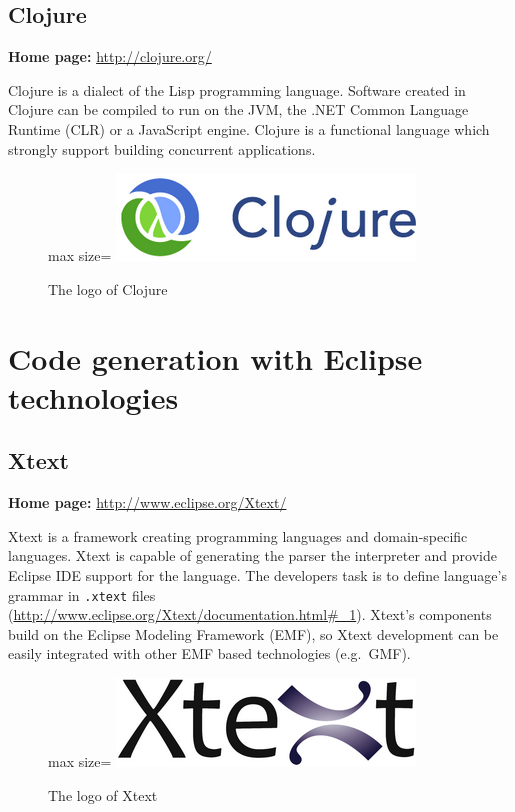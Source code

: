 \documentclass[]{report}
\let\Oldincludegraphics\includegraphics
\renewcommand{\includegraphics}[1]{
\begin{adjustbox}{max size={\textwidth}{\textheight}}
    \Oldincludegraphics[scale=0.6]{#1}%
\end{adjustbox}
}
\begin{document}
\subsection{Clojure}

\textbf{Home page:} \url{http://clojure.org/}

Clojure is a dialect of the Lisp programming language. Software created
in Clojure can be compiled to run on the JVM, the .NET Common Language
Runtime (CLR) or a JavaScript engine. Clojure is a functional language
which strongly support building concurrent applications.

\begin{figure}[htbp]
\centering
\includegraphics{img/code_generation/clojure_logo.png}
\caption{The logo of Clojure}
\end{figure}

\section{Code generation with Eclipse technologies}

\subsection{Xtext}

\textbf{Home page:} \url{http://www.eclipse.org/Xtext/}

Xtext is a framework creating programming languages and domain-specific
languages. Xtext is capable of generating the parser the interpreter and
provide Eclipse IDE support for the language. The developers task is to
define language's grammar in \texttt{.xtext} files
(\url{http://www.eclipse.org/Xtext/documentation.html\#_1}). Xtext's
components build on the Eclipse Modeling Framework (EMF), so Xtext
development can be easily integrated with other EMF based technologies
(e.g.~GMF).

\begin{figure}[htbp]
\centering
\includegraphics{img/code_generation/xtext_logo.png}
\caption{The logo of Xtext}
\end{figure}
\end{document}
